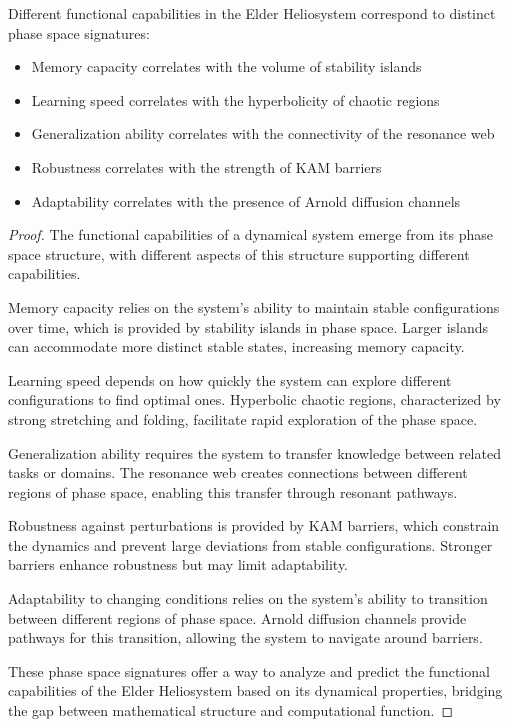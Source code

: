 \begin{theorem}
Different functional capabilities in the Elder Heliosystem correspond to distinct phase space signatures:
\begin{itemize}
    \item Memory capacity correlates with the volume of stability islands
    \item Learning speed correlates with the hyperbolicity of chaotic regions
    \item Generalization ability correlates with the connectivity of the resonance web
    \item Robustness correlates with the strength of KAM barriers
    \item Adaptability correlates with the presence of Arnold diffusion channels
\end{itemize}
\end{theorem}

\begin{proof}
The functional capabilities of a dynamical system emerge from its phase space structure, with different aspects of this structure supporting different capabilities.

Memory capacity relies on the system's ability to maintain stable configurations over time, which is provided by stability islands in phase space. Larger islands can accommodate more distinct stable states, increasing memory capacity.

Learning speed depends on how quickly the system can explore different configurations to find optimal ones. Hyperbolic chaotic regions, characterized by strong stretching and folding, facilitate rapid exploration of the phase space.

Generalization ability requires the system to transfer knowledge between related tasks or domains. The resonance web creates connections between different regions of phase space, enabling this transfer through resonant pathways.

Robustness against perturbations is provided by KAM barriers, which constrain the dynamics and prevent large deviations from stable configurations. Stronger barriers enhance robustness but may limit adaptability.

Adaptability to changing conditions relies on the system's ability to transition between different regions of phase space. Arnold diffusion channels provide pathways for this transition, allowing the system to navigate around barriers.

These phase space signatures offer a way to analyze and predict the functional capabilities of the Elder Heliosystem based on its dynamical properties, bridging the gap between mathematical structure and computational function.
\end{proof}


